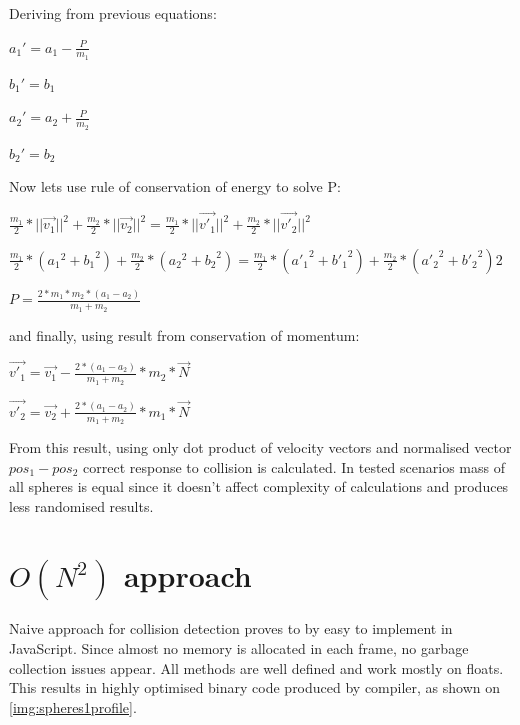 Deriving from previous equations:

 \begin{center}
$a_1' =  a_1 - \frac{P}{m_1}$

$b_1' = b_1$

$a_2' =  a_2 + \frac{P}{m_2}$

$b_2' = b_2$
\end{center}

Now lets use rule of conservation of energy to solve P:

 \begin{center}
$\frac{m_1}{2} * ||\vec{v_1}||^2 + \frac{m_2}{2} * ||\vec{v_2}||^2 = \frac{m_1}{2} * ||\vec{v'_1}||^2 + \frac{m_2}{2} * ||\vec{v'_2}||^2$

$\frac{m_1}{2} * ({a_1}^2 + {b_1}^2) + \frac{m_2}{2} * ({a_2}^2 + {b_2}^2) = \frac{m_1}{2} * ({a'_1}^2 + {b'_1}^2) + \frac{m_2}{2} * ({a'_2}^2 + {b'_2}^2)2$

$P = \frac{2*m_1*m_2*(a_1-a_2)}{m_1+m_2}$
\end{center}

and finally, using result from conservation of momentum:

 \begin{center}
$\vec{v'_1} =  \vec{v_1} - \frac{2*(a_1-a_2)}{m_1+m_2} * m_2 * \vec{N}$

$\vec{v'_2} =  \vec{v_2} + \frac{2*(a_1-a_2)}{m_1+m_2} * m_1 * \vec{N}$
\end{center}

From this result, using only dot product of velocity vectors and normalised vector $pos_1 - pos_2$ correct response to collision is calculated. In tested scenarios mass of all spheres is equal since it doesn't affect complexity of calculations and produces less randomised results.


\section{{$O(N^2)$} approach}
\label{sec:sphereinitial}

Naive approach for collision detection proves to by easy to implement in JavaScript. Since almost no memory is allocated in each frame, no garbage collection issues appear. All methods are well defined and work mostly on floats. This results in highly optimised binary code produced by compiler, as shown on \ref{img:spheres1profile}.

